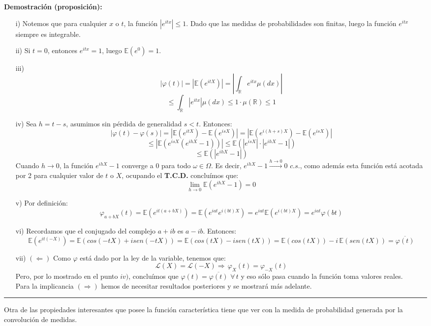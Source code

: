 \documentclass[a4paper]{article}
\numberwithin{equation}{subsection}
\def\R{\mathbb R}
\def\E{\mathbb E}
\def\to{\rightarrow}
\begin{document}
\textbf{Demostración (proposición):}
\begin{itemize}
    \item[i)] Notemos que para cualquier $x$ o $t$, la función $|e^{itx}|\leq 1$. Dado que las medidas de probabilidades son finitas, luego la función $e^{itx}$ siempre es integrable.
    
    \item[ii)] Si $t=0$, entonces $e^{itx} = 1$, luego $\E(e^{0})= 1$.
    \item[iii)] 
    \[|\varphi(t)| = |\E(e^{itX})| = \left| \int_{\R}e^{itx}\mu(dx) \right|\]
    \[\leq \int_{\R}|e^{itx}| \mu(dx) \leq 1\cdot \mu(\R) \leq 1\]
    \item[iv)] Sea $h=t-s$, asumimos sin pérdida de generalidad $s<t$. Entonces:
    \[|\varphi(t) -\varphi(s)| = |\E(e^{itX})-\E(e^{isX})| = |\E(e^{i(h+s)X})-\E(e^{isX})|\]
    \[\leq |\E(e^{isX}(e^{ihX}-1))|\leq \E(|e^{isX}|\cdot |e^{ihX}-1|)\]
    \[\leq \E(|e^{ihX}-1|)\]
    Cuando $h\rightarrow 0$, la función $e^{ihX}-1$ converge a $0$ para todo $\omega \in \Omega$. Es decir, $e^{ihX}-1 \xrightarrow{h\rightarrow 0} 0$ $c.s.$, como además esta función está acotada por 2 para cualquier valor de $t$ o $X$, ocupando el \textbf{T.C.D.} concluímos que:
    \[\lim_{h\to 0}\E(e^{ihX}-1) = 0\]
    
    \item[v)] Por definición:
    \[\varphi_{a+bX}(t) = \E(e^{it(a+bX)}) = \E(e^{iat}e^{i(bt)X}) = e^{iat}\E(e^{i(bt)X}) = e^{iat}\varphi(bt)\]
    \item[vi)] Recordamos que el conjugado del complejo $a+ib$ es $a-ib$. Entonces:
    \[\E(e^{it(-X)})= \E(cos(-tX)+isen(-tX)) = \E(cos(tX)-isen(tX))= \E(cos(tX))-i\,\E(sen(tX)) = \overline{\varphi(t)}\]
\item[vii)] $(\Leftarrow)$ Como $\varphi$ está dado por la ley de la variable, tenemos que:
\[\mathcal{L}(X)=\mathcal{L}(-X) \Rightarrow\,\varphi_X(t) = \varphi_{-X}(t)\]
Pero, por lo mostrado en el punto $iv)$, concluímos que $\varphi(t) = \overline{\varphi(t)}$ $\forall\,t$ y eso sólo pasa cuando la función toma valores reales.\\ \newline
Para la implicancia $(\Rightarrow)$ hemos de necesitar resultados posteriores y se mostrará más adelante.
\end{itemize}
\rule{0.7em}{0.7em}

Otra de las propiedades interesantes que posee la función característica tiene que ver con la medida de probabilidad generada por la convolución de medidas.
\end{document}
